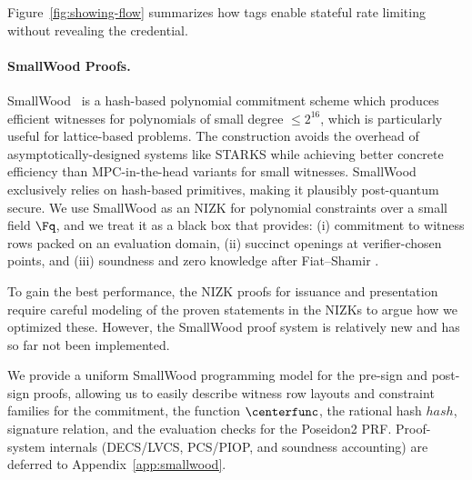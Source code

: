 Figure~\ref{fig:showing-flow} summarizes how tags enable stateful rate limiting without revealing the credential.



\paragraph{SmallWood Proofs.}

SmallWood~\cite{EPRINT:FenRiv25b} is a hash-based polynomial commitment scheme
which produces efficient witnesses for polynomials of small degree $\leq
2^{16}$, which is particularly useful for
lattice-based problems. The construction avoids the overhead of
asymptotically-designed systems like STARKS while achieving better concrete
efficiency than MPC-in-the-head variants for small witnesses. SmallWood exclusively relies on
hash-based primitives, making it plausibly post-quantum secure. 
We use SmallWood as an 
NIZK for polynomial constraints over a small field \(\Fq\), and we treat it as a black box that provides:
(i) commitment to witness rows packed on an evaluation domain, (ii) succinct openings at verifier-chosen points, and
(iii) soundness and zero knowledge after Fiat--Shamir \cite{EPRINT:FenRiv25b}.

To gain the best performance, the NIZK proofs for issuance and presentation require careful modeling of the proven statements in the NIZKs to argue how we optimized these. 
 However, the SmallWood proof system is relatively new and has so far not been implemented.

We provide a uniform SmallWood programming model for the pre-sign
and post-sign proofs, allowing us to easily describe witness row layouts and constraint families for the commitment, the function $\centerfunc$,  the rational hash $hash$, signature relation, and the evaluation checks for the Poseidon2 PRF.  Proof-system internals (DECS/LVCS,
PCS/PIOP, and soundness accounting) are deferred to Appendix~\ref{app:smallwood}.









